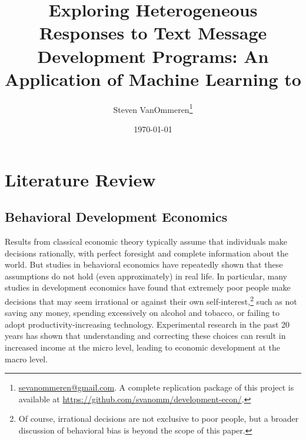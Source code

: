 \documentclass[12pt]{article}
\begin{document}
\title{Exploring Heterogeneous Responses to Text Message Development Programs: An Application of Machine Learning to \textcite{fabregas_digital_2025}}
\author{Steven VanOmmeren\thanks{\href{mailto:sevanommeren@gmail.com}{sevanommeren@gmail.com}. A complete replication package of this project is available at \url{https://github.com/svanomm/development-econ/}.}}
\date{\today}
\maketitle
\noindent
\tableofcontents
\newpage

\doublespacing
\section{Literature Review}
\label{section:litreview}

\subsection{Behavioral Development Economics}
Results from classical economic theory typically assume that individuals make decisions rationally, with perfect foresight and complete information about the world. But studies in behavioral economics have repeatedly shown that these assumptions do not hold (even approximately) in real life. In particular, many studies in development economics have found that extremely poor people make decisions that may seem irrational or against their own self-interest,\footnote{Of course, irrational decisions are not exclusive to poor people, but a broader discussion of behavioral bias is beyond the scope of this paper.} such as not saving any money, spending excessively on alcohol and tobacco, or failing to adopt productivity-increasing technology. Experimental research in the past 20 years has shown that understanding and correcting these choices can result in increased income at the micro level, leading to economic development at the macro level.
\end{document}
